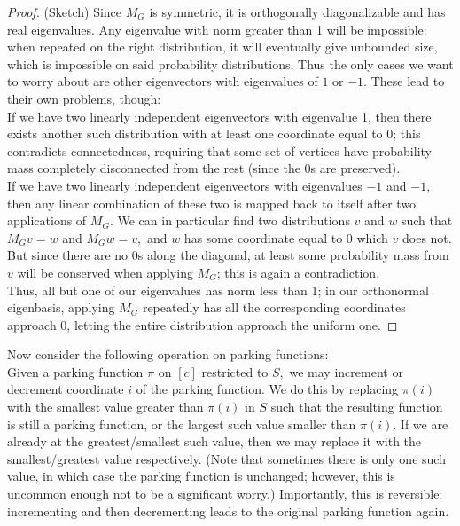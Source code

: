\begin{proof}
    (Sketch) Since $M_G$ is symmetric, it is orthogonally diagonalizable and has real eigenvalues. Any eigenvalue with norm greater than 1 will be impossible: when repeated on the right distribution, it will eventually give unbounded size, which is impossible on said probability distributions. Thus the only cases we want to worry about are other eigenvectors with eigenvalues of $1$ or $-1.$ These lead to their own problems, though:\\

    If we have two linearly independent eigenvectors with eigenvalue 1, then there exists another such distribution with at least one coordinate equal to 0; this contradicts connectedness, requiring that some set of vertices have probability mass completely disconnected from the rest (since the 0s are preserved).\\

    If we have two linearly independent eigenvectors with eigenvalues $-1$ and $-1$, then any linear combination of these two is mapped back to itself after two applications of $M_G.$ We can in particular find two distributions $v$ and $w$ such that $M_Gv=w$ and $M_Gw=v,$ and $w$ has some coordinate equal to 0 which $v$ does not. But since there are no 0s along the diagonal, at least some probability mass from $v$ will be conserved when applying $M_G$; this is again a contradiction.\\

    Thus, all but one of our eigenvalues has norm less than 1; in our orthonormal eigenbasis, applying $M_G$ repeatedly has all the corresponding coordinates approach 0, letting the entire distribution approach the uniform one.
\end{proof}

Now consider the following operation on parking functions:\\

Given a parking function $\pi$ on $[c]$ restricted to $S,$ we may increment or decrement coordinate $i$ of the parking function. We do this by replacing $\pi(i)$ with the smallest value greater than $\pi(i)$ in $S$ such that the resulting function is still a parking function, or the largest such value smaller than $\pi(i).$ If we are already at the greatest/smallest such value, then we may replace it with the smallest/greatest value respectively. (Note that sometimes there is only one such value, in which case the parking function is unchanged; however, this is uncommon enough not to be a significant worry.) Importantly, this is reversible: incrementing and then decrementing leads to the original parking function again.\\

